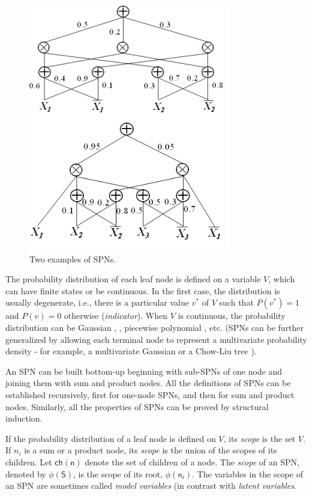 \begin{figure}[H]
\caption{Two examples of SPNs.}
\label{fig:spn}
\centering
\includegraphics[scale=0.6]{Figures/SPN.png}
\end{figure}
The probability distribution of each leaf node is defined on a variable $V$, which can have finite states or be continuous. In the first case, the distribution is usually degenerate, i.e., there is a particular value $v^{*}$ of $V$ such that $P(v^{*}) = 1$ and $P(v) = 0$ otherwise (\textit{indicator}). When $V$ is continuous, the probability distribution can be Gaussian \cite{pmlr-v28-gens13}, \cite{pmlr-v32-rooshenas14}, piecewise polynomial \cite{DBLP:journals/corr/abs-1710-03297}, etc. (SPNs can be further generalized by allowing each terminal node to represent a multivariate probability density - for example, a multivariate Gaussian \cite{DBLP:journals/corr/DesanaS16} or a Chow-Liu tree \cite{10.1007/978-3-319-23525-7_21}).

An SPN can be built bottom-up beginning with sub-SPNs of one node and joining them with sum and product nodes. All the definitions of SPNs can be established recursively, first for one-node SPNs, and then for sum and product nodes. Similarly, all the properties of SPNs can be proved by structural induction.

If the probability distribution of a leaf node is defined on $V$, its \textit{scope} is the set ${V}$. If $n_i$ is a sum or a product node, its \textit{scope} is the union of the scopes of its children. Let $\mathsf{ch(n)}$ denote the set of children of a node. The \textit{scope} of an SPN, denoted by $\phi(\mathsf{S})$, is the scope of its root, $\phi(\mathsf{n_r})$. The variables in the scope of an SPN are sometimes called \textit{model variables} (in contrast with \textit{latent variables}.

